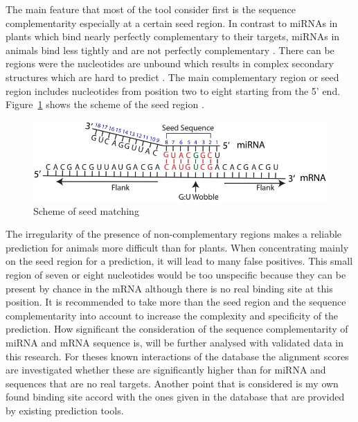 \documentclass[11pt,  a4paper]{report}
\begin{document}
The main feature that most of the tool consider first is the sequence complementarity especially at a certain seed region. In contrast to miRNAs in plants which bind nearly perfectly complementary to their targets, miRNAs in animals bind less tightly and are not perfectly complementary \cite{Rhoades}. There can be regions were the nucleotides are unbound which results in complex secondary structures which are hard to predict \cite{Rehmsmeier}. The main complementary region or seed region includes nucleotides from position two to eight starting from the 5' end. Figure~\ref{seed} shows the scheme of the seed region \cite{Peterson}. \\


\begin{figure}[h]
\centering
\includegraphics[scale=2.8]{results/seedmatching.png} 
\caption{Scheme of seed matching}
\label{seed}
\end{figure}

The irregularity of the presence of non-complementary regions makes a reliable prediction for animals more difficult than for plants. When concentrating mainly on the seed region for a prediction, it will lead to many false positives. This small region of seven or eight nucleotides would be too unspecific because they can be present by chance in the mRNA although there is no real binding site at this position. It is recommended to take more than the seed region and the sequence complementarity into account to increase the complexity and specificity of the prediction. How significant the consideration of the sequence complementarity of miRNA and mRNA sequence is, will be further analysed with validated data in this research. For theses known interactions of the database the alignment scores are investigated whether these are significantly higher than for miRNA and sequences that are no real targets. Another point that is considered is my own found binding site accord with the ones given in the database that are provided by existing prediction tools. \\
\end{document}
